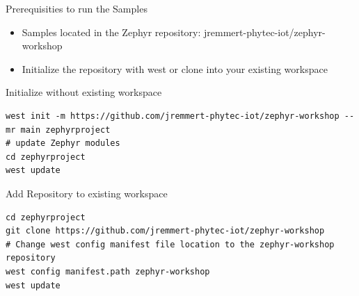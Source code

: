 \documentclass[10pt, aspectratio=169]{beamer}
\begin{document}
\begin{frame}[fragile]{Prerequisities to run the Samples}

  \begin{itemize}
     \item Samples located in the Zephyr repository: jremmert-phytec-iot/zephyr-workshop
     \item Initialize the repository with west or clone into your existing workspace
  \end{itemize}

     \begin{exampleblock}{Initialize without existing workspace}
      {\fontsize{7}{8.6}\selectfont
        \begin{verbatim}
west init -m https://github.com/jremmert-phytec-iot/zephyr-workshop --mr main zephyrproject
# update Zephyr modules
cd zephyrproject
west update
        \end{verbatim}
      }
    \end{exampleblock}

     \begin{exampleblock}{Add Repository to existing workspace}
      {\fontsize{7}{8.6}\selectfont
        \begin{verbatim}
cd zephyrproject
git clone https://github.com/jremmert-phytec-iot/zephyr-workshop
# Change west config manifest file location to the zephyr-workshop repository
west config manifest.path zephyr-workshop
west update
        \end{verbatim}
      }
    \end{exampleblock}
\end{frame}
\end{document}

